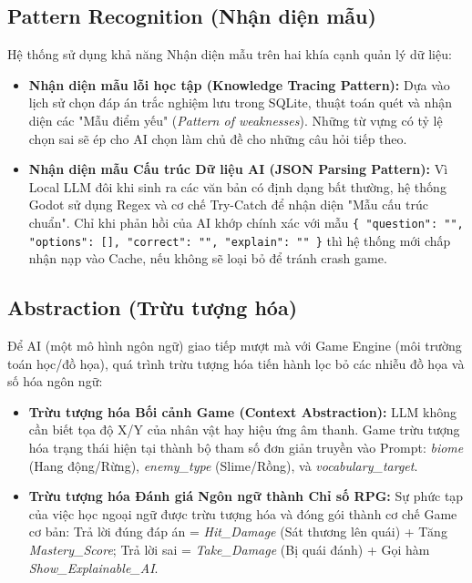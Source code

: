 \subsection{Pattern Recognition (Nhận diện mẫu)}
Hệ thống sử dụng khả năng Nhận diện mẫu trên hai khía cạnh quản lý dữ liệu:
\begin{itemize}
    \item \textbf{Nhận diện mẫu lỗi học tập (Knowledge Tracing Pattern):} Dựa vào lịch sử chọn đáp án trắc nghiệm lưu trong SQLite, thuật toán quét và nhận diện các "Mẫu điểm yếu" (\textit{Pattern of weaknesses}). Những từ vựng có tỷ lệ chọn sai sẽ ép cho AI chọn làm chủ đề cho những câu hỏi tiếp theo.
    \item \textbf{Nhận diện mẫu Cấu trúc Dữ liệu AI (JSON Parsing Pattern):} Vì Local LLM đôi khi sinh ra các văn bản có định dạng bất thường, hệ thống Godot sử dụng Regex và cơ chế Try-Catch để nhận diện "Mẫu cấu trúc chuẩn". Chỉ khi phản hồi của AI khớp chính xác với mẫu \texttt{\{ "question": "", "options": [], "correct": "", "explain": "" \}} thì hệ thống mới chấp nhận nạp vào Cache, nếu không sẽ loại bỏ để tránh crash game.
\end{itemize}

\subsection{Abstraction (Trừu tượng hóa)}
Để AI (một mô hình ngôn ngữ) giao tiếp mượt mà với Game Engine (môi trường toán học/đồ họa), quá trình trừu tượng hóa tiến hành lọc bỏ các nhiễu đồ họa và số hóa ngôn ngữ:
\begin{itemize}
    \item \textbf{Trừu tượng hóa Bối cảnh Game (Context Abstraction):} LLM không cần biết tọa độ X/Y của nhân vật hay hiệu ứng âm thanh. Game trừu tượng hóa trạng thái hiện tại thành bộ tham số đơn giản truyền vào Prompt: \textit{biome} (Hang động/Rừng), \textit{enemy\_type} (Slime/Rồng), và \textit{vocabulary\_target}.
    \item \textbf{Trừu tượng hóa Đánh giá Ngôn ngữ thành Chỉ số RPG:} Sự phức tạp của việc học ngoại ngữ được trừu tượng hóa và đóng gói thành cơ chế Game cơ bản: Trả lời đúng đáp án = \textit{Hit\_Damage} (Sát thương lên quái) + Tăng \textit{Mastery\_Score}; Trả lời sai = \textit{Take\_Damage} (Bị quái đánh) + Gọi hàm \textit{Show\_Explainable\_AI}.
\end{itemize}

